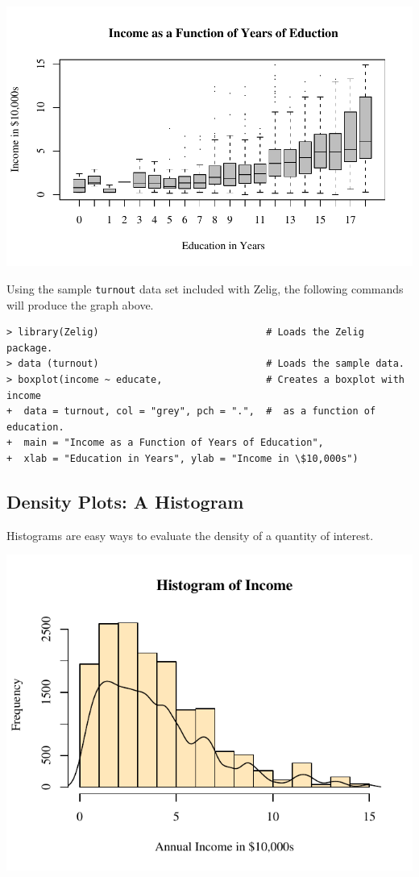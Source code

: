 \documentclass{article}
\begin{document}
\begin{center}
\includegraphics{figs/sample1}
\end{center}
Using the sample \texttt{turnout} data set included with Zelig, the
following commands will produce the graph above.
\begin{verbatim}
> library(Zelig)                             # Loads the Zelig package.
> data (turnout)                             # Loads the sample data.
> boxplot(income ~ educate,                  # Creates a boxplot with income
+  data = turnout, col = "grey", pch = ".",  #  as a function of education.  
+  main = "Income as a Function of Years of Education", 
+  xlab = "Education in Years", ylab = "Income in \$10,000s")
\end{verbatim}

\newpage

\subsection{Density Plots: A Histogram}

Histograms are easy ways to evaluate the density of a quantity of
interest.  

\begin{center}
\includegraphics{figs/sample2}
\end{center}
\end{document}

